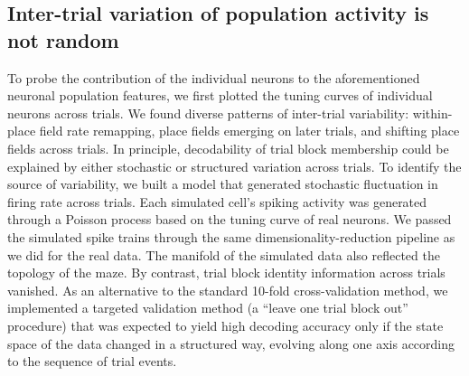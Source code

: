 \subsection{Inter-trial variation of population activity is not random}

To probe the contribution of the individual neurons to the aforementioned neuronal population features, we first plotted the tuning curves of individual neurons across trials. We found diverse patterns of inter-trial variability: within-place field rate remapping, place fields emerging on later trials, and shifting place fields across trials. In principle, decodability of trial block membership could be explained by either stochastic or structured variation across trials. To identify the source of variability, we built a model that generated stochastic fluctuation in firing rate across trials. Each simulated cell's spiking activity was generated through a Poisson process based on the tuning curve of real neurons. We passed the simulated spike trains through the same dimensionality-reduction pipeline as we did for the real data. The manifold of the simulated data also reflected the topology of the maze. By contrast, trial block identity information across trials vanished. As an alternative to the standard 10-fold cross-validation method, we implemented a targeted validation method (a ``leave one trial block out'' procedure) that was expected to yield high decoding accuracy only if the state space of the data changed in a structured way, evolving along one axis according to the sequence of trial events.


